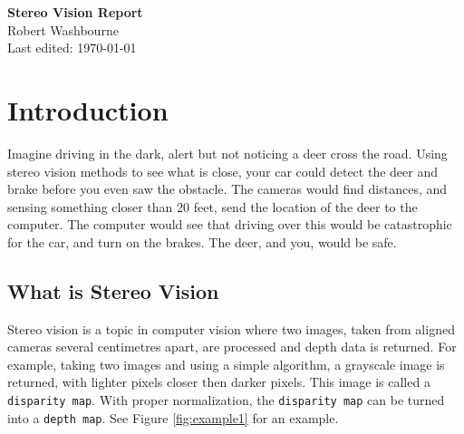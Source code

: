 \documentclass[11pt,fleqn]{article}
\begin{document}
\begin{center}
\Large{\textbf{Stereo Vision Report}}\\[5pt]
\large{Robert Washbourne}\\
Last edited: \today
\end{center}

\tableofcontents
\listoffigures
\newpage

\section{Introduction}

Imagine driving in the dark, alert but not noticing a deer cross the road. Using stereo vision methods to see what is close, your car could detect the deer and brake before you even saw the obstacle. The cameras would find distances, and sensing something closer than 20 feet, send the location of the deer to the computer. The computer would see that driving over this would be catastrophic for the car, and turn on the brakes. The deer, and you, would be safe.

\subsection{What is Stereo Vision}

Stereo vision is a topic in computer vision where two images, taken from aligned cameras several centimetres apart, are processed and depth data is returned. For example, taking two images and using a simple algorithm, a grayscale image is returned, with lighter pixels closer then darker pixels. This image is called a \texttt{disparity map}. With proper normalization, the \texttt{disparity map} can be turned into a \texttt{depth map}. See Figure \ref{fig:example1} for an example.\\[5pt]
\end{document}
